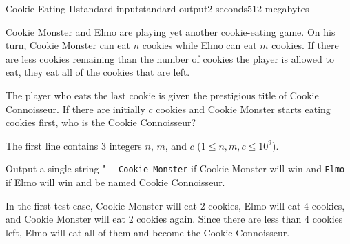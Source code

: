 \begin{problem}{Cookie Eating II}{standard input}{standard output}{2 seconds}{512 megabytes}

Cookie Monster and Elmo are playing yet another cookie-eating game. On his turn, Cookie Monster can eat $n$ cookies while Elmo can eat $m$ cookies. If there are less cookies remaining than the number of cookies the player is allowed to eat, they eat all of the cookies that are left. 

The player who eats the last cookie is given the prestigious title of Cookie Connoisseur. If there are initially $c$ cookies and Cookie Monster starts eating cookies first, who is the Cookie Connoisseur?

\InputFile
The first line contains $3$ integers $n$, $m$, and $c$ ($1 \le n, m, c \le 10^9$).

\OutputFile
Output a single string "--- \texttt{Cookie Monster} if Cookie Monster will win and \texttt{Elmo} if Elmo will win and be named Cookie Connoisseur.

\Examples

\begin{example}
%
%
%
%
\end{example}

\Note
In the first test case, Cookie Monster will eat $2$ cookies, Elmo will eat $4$ cookies, and Cookie Monster will eat $2$ cookies again. Since there are less than $4$ cookies left, Elmo will eat all of them and become the Cookie Connoisseur.

\end{problem}

